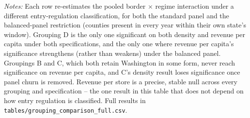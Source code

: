 \begin{table}[htbp]
\centering
\caption{Comparison of entry-regulation groupings: border $\times$ regime interaction $p$-values (county-clustered)}
\label{tab:grouping_comparison}
\footnotesize
{}
\begin{minipage}{0.95\textwidth}
\vspace{0.3em}
\footnotesize
\textit{Notes:} Each row re-estimates the pooled border $\times$ regime interaction under a different
entry-regulation classification, for both the standard panel and the balanced-panel restriction (counties
present in every year within their own state's window). Grouping D is the only one significant on both
density and revenue per capita under both specifications, and the only one where revenue per capita's
significance strengthens (rather than weakens) under the balanced panel. Groupings B and C, which both retain
Washington in some form, never reach significance on revenue per capita, and C's density result loses
significance once panel churn is removed. Revenue per store is a precise, stable null across every grouping
and specification -- the one result in this table that does not depend on how entry regulation is classified.
Full results in \texttt{tables/grouping\_comparison\_full.csv}.
\end{minipage}
\end{table}
